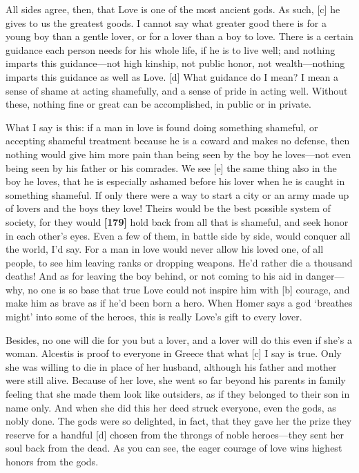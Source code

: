 All sides agree, then, that Love is one of the most ancient gods. As
such, {[}c{]} he gives to us the greatest goods. I cannot say what
greater good there is for a young boy than a gentle lover, or for a
lover than a boy to love. There is a certain guidance each person needs
for his whole life, if he is to live well; and nothing imparts this
guidance---not high kinship, not public honor, not wealth---nothing
imparts this guidance as well as Love. {[}d{]} What guidance do I mean?
I mean a sense of shame at acting shamefully, and a sense of pride in
acting well. Without these, nothing fine or great can be accomplished,
in public or in private.

What I say is this: if a man in love is found doing something shameful,
or accepting shameful treatment because he is a coward and makes no
defense, then nothing would give him more pain than being seen by the
boy he loves---not even being seen by his father or his comrades. We see
{[}e{]} the same thing also in the boy he loves, that he is especially
ashamed before his lover when he is caught in something shameful. If
only there were a way to start a city or an army made up of lovers and
the boys they love! Theirs would be the best possible system of society,
for they would {\bf {[}179{]}} hold back from all that is shameful, and
seek honor in each other's
eyes. Even a few of
them, in battle side by side, would conquer all the world, I'd say. For
a man in love would never allow his loved one, of all people, to see him
leaving ranks or dropping weapons. He'd rather die a thousand deaths!
And as for leaving the boy behind, or not coming to his aid in
danger---why, no one is so base that true Love could not inspire him
with {[}b{]} courage, and make him as brave as if he'd been born a hero.
When Homer says a god ‘breathes might' into some of the heroes, this is
really Love's gift to every
lover.

Besides, no one will die for you but a lover, and a lover will do this
even if she's a woman. Alcestis is proof to everyone in Greece that what
{[}c{]} I say is
true. Only she was
willing to die in place of her husband, although his father and mother
were still alive. Because of her love, she went so far beyond his
parents in family feeling that she made them look like outsiders, as if
they belonged to their son in name only. And when she did this her deed
struck everyone, even the gods, as nobly done. The gods were so
delighted, in fact, that they gave her the prize they reserve for a
handful {[}d{]} chosen from the throngs of noble heroes---they sent her
soul back from the dead. As you can see, the eager courage of love wins
highest honors from the gods.

